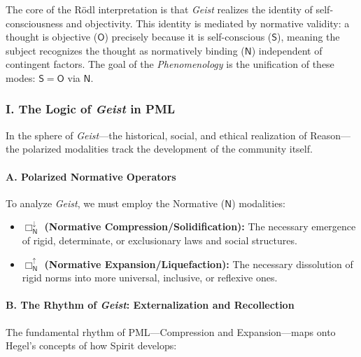 The core of the Rödl interpretation is that \emph{Geist} realizes the identity of self-consciousness and objectivity. This identity is mediated by normative validity: a thought is objective (\(\mathsf{O}\)) precisely because it is self-conscious (\(\mathsf{S}\)), meaning the subject recognizes the thought as normatively binding (\(\mathsf{N}\)) independent of contingent factors. The goal of the \emph{Phenomenology} is the unification of these modes: \(\mathsf{S} = \mathsf{O}\) via \(\mathsf{N}\).

\subsubsection{\texorpdfstring{I. The Logic of \emph{Geist} in PML}{I. The Logic of Geist in PML}}\label{i.-the-logic-of-geist-in-pml}

In the sphere of \emph{Geist}---the historical, social, and ethical realization of Reason---the polarized modalities track the development of the community itself.

\paragraph{A. Polarized Normative Operators}\label{a.-polarized-normative-operators}

To analyze \emph{Geist}, we must employ the Normative (\(\mathsf{N}\)) modalities:

\begin{itemize}
\tightlist
\item
  \textbf{\(\Box_{\mathsf{N}}^{\downarrow}\) (Normative Compression/Solidification):} The necessary emergence of rigid, determinate, or exclusionary laws and social structures.
\item
  \textbf{\(\Box_{\mathsf{N}}^{\uparrow}\) (Normative Expansion/Liquefaction):} The necessary dissolution of rigid norms into more universal, inclusive, or reflexive ones.
\end{itemize}

\paragraph{\texorpdfstring{B. The Rhythm of \emph{Geist}: Externalization and Recollection}{B. The Rhythm of Geist: Externalization and Recollection}}\label{b.-the-rhythm-of-geist-externalization-and-recollection}

The fundamental rhythm of PML---Compression and Expansion---maps onto Hegel's concepts of how Spirit develops:

